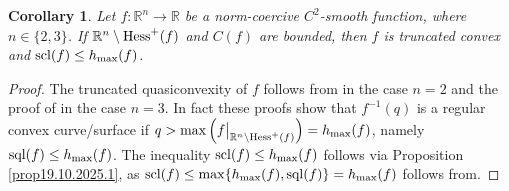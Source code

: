 \documentclass[12pt,twoside,reqno]{amsart}
\newtheorem{corollary}{Corollary}[section]
\theoremstyle{definition}
\numberwithin{equation}{section}
\begin{document}
\begin{corollary}\label{cor31.10.2025.2}
Let $f:\mathbb{R}^n\longrightarrow\mathbb{R}$ be a norm-coercive $C^2$-smooth function, where $n\in\{2,3\}$.
If $\mathbb{R}^n\setminus {\rm Hess}^+(f)$ and $C(f)$ are bounded, then $f$ is truncated convex and ${\rm scl}(f)\leq h_{\max}(f)$.
\end{corollary}
\begin{proof}
 The truncated quasiconvexity of $f$ follows from \cite[Theorem 3.7]{Bro-Pi} in the case $n=2$ and the proof of \cite[Theorem 3.4]{Pi-1} in the case $n=3$.
 In fact these proofs show that $f^{-1}(q)$ is a regular convex curve/surface if $q>\max\left(f\big|_{\mathbb{R}^n\setminus {\rm Hess}^+(f)}\right)=h_{\max}(f)$, namely 
 ${\rm sql}(f)\leq h_{\max}(f)$.
 The inequality ${\rm scl}(f)\leq h_{\max}(f)$ follows via Proposition \ref{prop19.10.2025.1}, as ${\rm scl}(f)\leq \max\{h_{\max}(f),{\rm sql}(f)\}=h_{\max}(f)$ follows from. 
\end{proof}
\end{document}
